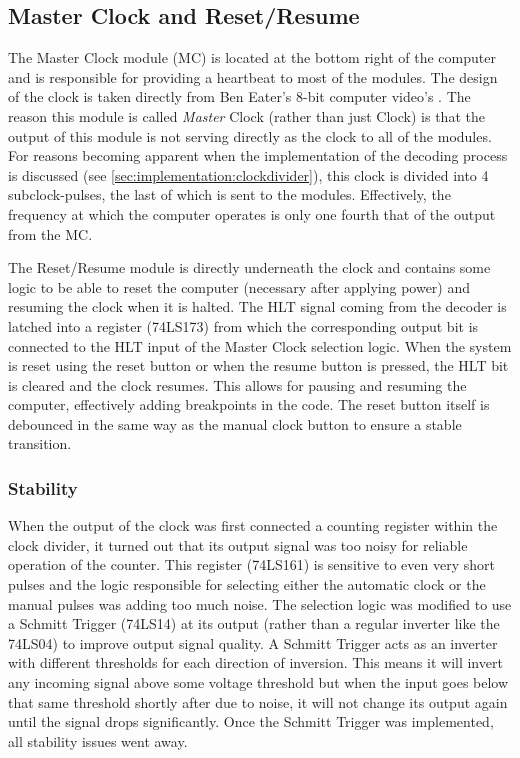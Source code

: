 \subsection{Master Clock and Reset/Resume}
The Master Clock module (MC) is located at the bottom right of the computer and is responsible for providing a heartbeat to most of the modules. The design of the clock is taken directly from Ben Eater's 8-bit computer video's \cite{beneater}. The reason this module is called \emph{Master} Clock (rather than just Clock) is that the output of this module is not serving directly as the clock to all of the modules. For reasons becoming apparent when the implementation of the decoding process is discussed (see \ref{sec:implementation:clockdivider}), this clock is divided into 4 subclock-pulses, the last of which is sent to the modules. Effectively,  the frequency at which the computer operates is only one fourth that of the output from the MC.

The Reset/Resume module is directly underneath the clock and contains some logic to be able to reset the computer (necessary after applying power) and resuming the clock when it is halted. The HLT signal coming from the decoder is latched into a register (74LS173) from which the corresponding output bit is connected to the HLT input of the Master Clock selection logic. When the system is reset using the reset button or when the resume button is pressed, the HLT bit is cleared and the clock resumes. This allows for pausing and resuming the computer, effectively adding breakpoints in the code. The reset button itself is debounced in the same way as the manual clock button to ensure a stable transition. 

\subsubsection{Stability}
When the output of the clock was first connected a counting register within the clock divider, it turned out that its output signal was too noisy for reliable operation of the counter. This register (74LS161) is sensitive to even very short pulses and the logic responsible for selecting either the automatic clock or the manual pulses was adding too much noise. The selection logic was modified to use a Schmitt Trigger (74LS14) at its output (rather than a regular inverter like the 74LS04) to improve output signal quality. A Schmitt Trigger acts as an inverter with different thresholds for each direction of inversion. This means it will invert any incoming signal above some voltage threshold but when the input goes below that same threshold shortly after due to noise, it will not change its output again until the signal drops significantly. Once the Schmitt Trigger was implemented, all stability issues went away.

